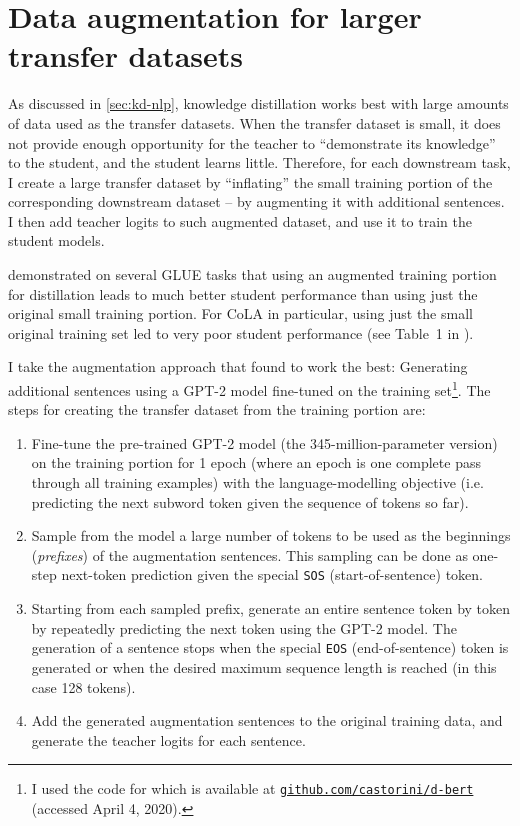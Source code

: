 \documentclass[bsc,frontabs,twoside,singlespacing,parskip,deptreport]{infthesis}
\newcommand\rurl[1]{%
  \href{https://#1}{\nolinkurl{#1}}%
}
\begin{document}
{  \section{Data augmentation for larger transfer datasets}{
    \label{sec:augmentation}
    As discussed in \autoref{sec:kd-nlp}, knowledge distillation works best with large amounts of data used as the transfer datasets. When the transfer dataset is small, it does not provide enough opportunity for the teacher to ``demonstrate its knowledge'' to the student, and the student learns little. Therefore, for each downstream task, I create a large transfer dataset by ``inflating'' the small training portion of the corresponding downstream dataset -- by augmenting it with additional sentences. I then add teacher logits to such augmented dataset, and use it to train the student models.

    \citet{Tang_2019b} demonstrated on several GLUE tasks that using an augmented training portion for distillation leads to much better student performance than using just the original small training portion.
    For CoLA in particular, using just the small original training set led to very poor student performance (see Table~1 in \citeauthor{Tang_2019b}).
    
    I take the augmentation approach that \citeauthor{Tang_2019b} found to work the best: Generating additional sentences using a GPT-2 model \citep{Radford_2019} fine-tuned on the training set\footnote{I used the code for \citet{Tang_2019b} which is available at \rurl{github.com/castorini/d-bert} (accessed April 4, 2020).}. The steps for creating the transfer dataset from the training portion are:
    \begin{enumerate}
      \item Fine-tune the pre-trained GPT-2 model (the 345-million-parameter version) on the training portion for 1 epoch (where an epoch is one complete pass through all training examples) with the language-modelling objective (i.e. predicting the next subword token given the sequence of tokens so far).
      \item Sample from the model a large number of tokens to be used as the beginnings (\textit{prefixes}) of the augmentation sentences. This sampling can be done as one-step next-token prediction given the special \verb|SOS| (start-of-sentence) token.
      \item Starting from each sampled prefix, generate an entire sentence token by token by repeatedly predicting the next token using the GPT-2 model. The generation of a sentence stops when the special \verb|EOS| (end-of-sentence) token is generated or when the desired maximum sequence length is reached (in this case 128 tokens).
      \item Add the generated augmentation sentences to the original training data, and generate the teacher logits for each sentence.
    \end{enumerate}

}}
\end{document}
